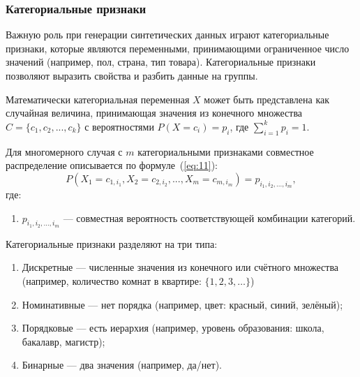 \subsubsection{Категориальные признаки}

Важную роль при генерации синтетических данных играют категориальные признаки, которые являются переменными, принимающими ограниченное число значений (например, пол, страна, тип товара).
Категориальные признаки позволяют выразить свойства и разбить данные на группы.~\cite{uch}

Математически категориальная переменная $X$ может быть представлена как случайная величина, принимающая значения из конечного множества ${C} = \{c_1, c_2, ..., c_k\}$ с вероятностями $P(X = c_i) = p_i$, где $\sum_{i=1}^{k} p_i = 1$.

Для многомерного случая с $m$ категориальными признаками совместное распределение описывается по формуле~(\ref{eq:11}):
\begin{equation}\label{eq:11}
    P(X_1 = c_{1,i_1}, X_2 = c_{2,i_2}, ..., X_m = c_{m,i_m}) = p_{i_1,i_2,...,i_m},
\end{equation}
где: 
\begin{enumerate}[label*=---]
	\item $p_{i_1,i_2,...,i_m}$ --- совместная вероятность соответствующей комбинации категорий.
\end{enumerate}
Категориальные признаки разделяют на три типа:
\begin{enumerate}[label*=---]
	\item Дискретные --- численные значения из конечного или счётного множества (например, количество комнат в квартире: $\{1, 2, 3, \dots\}$)
	\item Номинативные --- нет порядка (например, цвет: красный, синий, зелёный);
	\item Порядковые --- есть иерархия (например, уровень образования: школа, бакалавр, магистр);
	\item Бинарные --- два значения (например, да/нет).
\end{enumerate}

